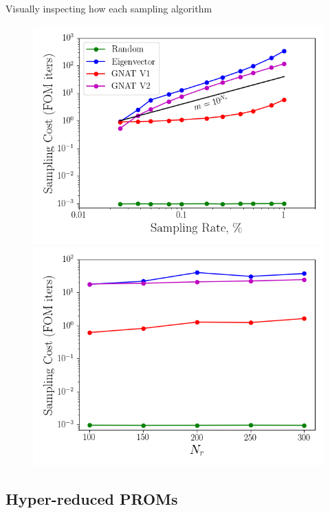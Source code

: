 Visually inspecting how each sampling algorithm

\begin{figure}
	\begin{minipage}{0.49\linewidth}
		\includegraphics[width=0.99\linewidth]{Chapters/HPROMResults/Images/cvrc/deim/samp_timing_wrt_samprate.png}
	\end{minipage}
	\begin{minipage}{0.49\linewidth}
		\includegraphics[width=0.99\linewidth]{Chapters/HPROMResults/Images/cvrc/deim/samp_timing_wrt_modes.png}
	\end{minipage}
\end{figure}

\subsection{Hyper-reduced PROMs}



